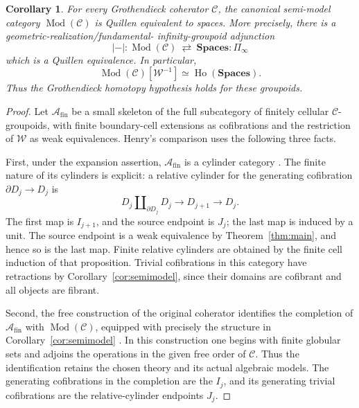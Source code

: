 \documentclass[11pt,letterpaper]{article}
\numberwithin{equation}{section}
\theoremstyle{plain}
\newtheorem{corollary}[theorem]{Corollary}
\theoremstyle{definition}
\theoremstyle{remark}
\DeclareMathOperator{\Mod}{Mod}
\newcommand{\Spaces}{\mathbf{Spaces}}
\begin{document}
\begin{corollary}\label{cor:homotopy-hypothesis}
For every Grothendieck coherator \(\mathcal C\), the canonical
semi-model category \(\Mod(\mathcal C)\) is Quillen equivalent to
spaces.  More precisely, there is a geometric-realization/fundamental-
infinity-groupoid adjunction
\[
 |-|:\Mod(\mathcal C)\ \rightleftarrows\ \Spaces:\Pi_\infty
\]
which is a Quillen equivalence.  In particular,
\[
 \Mod(\mathcal C)[\mathcal W^{-1}]
       \simeq \operatorname{Ho}(\Spaces).
\]
Thus the Grothendieck homotopy hypothesis holds for these groupoids.
\end{corollary}

\begin{proof}
Let \(\mathcal A_{\mathrm{fin}}\) be a small skeleton of the full
subcategory of finitely cellular \(\mathcal C\)-groupoids, with finite boundary-cell
extensions as cofibrations and the restriction of \(\mathcal W\)
as weak equivalences.  Henry's comparison uses the following three
facts.

First, under the expansion assertion, \(\mathcal A_{\mathrm{fin}}\)
is a cylinder category
\cite[Proposition~5.3.6]{Henry2016}.  The finite nature of its
cylinders is explicit: a relative cylinder for the generating
cofibration \(\partial D_j\to D_j\) is
\[
 D_j\amalg_{\partial D_j}D_j
       \longrightarrow D_{j+1}\longrightarrow D_j.
\]
The first map is \(I_{j+1}\), and the source endpoint is \(J_j\);
the last map is induced by a unit.  The source endpoint is a weak
equivalence by Theorem~\ref{thm:main}, and hence so is the last map.
Finite relative cylinders are obtained by the finite cell induction
of that proposition.  Trivial cofibrations in this category have
retractions by Corollary~\ref{cor:semimodel}, since their domains are
cofibrant and all objects are fibrant.

Second, the free construction of the original coherator identifies
the completion of \(\mathcal A_{\mathrm{fin}}\) with
\(\Mod(\mathcal C)\), equipped with precisely the structure in
Corollary~\ref{cor:semimodel}
\cite[Proposition~5.3.7]{Henry2016}.  In this construction one begins
with finite globular sets and adjoins the operations in the given
free order of \(\mathcal C\).  Thus the identification retains the
chosen theory and its actual algebraic models.  The generating
cofibrations in the completion are the \(I_j\), and its generating
trivial cofibrations are the relative-cylinder endpoints \(J_j\).


\end{proof}
\end{document}
